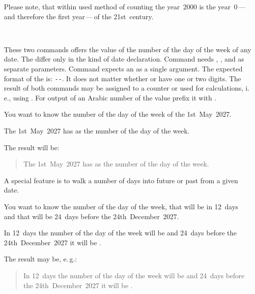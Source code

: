 Please note, that within used method of counting the
year~2000 is the year~0\,---\,and therefore the first year\,---\,of the
21st~century.%
%
%

\begin{Declaration}
  \\%
\end{Declaration}%
%
%
These two commands offers the value of
the number of the day of the week of any date. The
differ only in the kind of date declaration. Command  needs
, , and  as separate parameters. Command
 expects an  as a single argument. The
expected format of the  is:
\texttt{-}\texttt{-}. It does not matter
whether  or  have one or two digits. The result of
both commands may be assigned to a counter or used for calculations, i.\,e.,
using . For output of an
Arabic number of the value prefix it with .

\begin{Example}
  You want to know the number of the day of the week of the 1st~May~2027.
\begin{lstcode}
  The 1st~May~2027 has \the{}
  as the number of the day of the week.
\end{lstcode}
  The result will be:
  \begin{quote}
    The 1st~May~2027 has \the{}
    as the number of the day of the week.
  \end{quote}
\end{Example}

A special feature is to walk a number of days into future or past from a given
date.
\begin{Example}
  You want to know the number of the day of the week, that will be in 12~days
  and that will be 24~days before the 24th~December~2027.
\begin{lstcode}
  In 12~days the number of the day of the week
  will be \the{} and
  24~days before the 24th~December~2027 it will be
  \the{}.
\end{lstcode}
  The result may be, e.\,g.:
  \begin{quote}
    In 12~days the number of the day of the week
    will be \the{} and
    24~days before the 24th~December~2027 it will be
    \the{}.
  \end{quote}
\end{Example}

